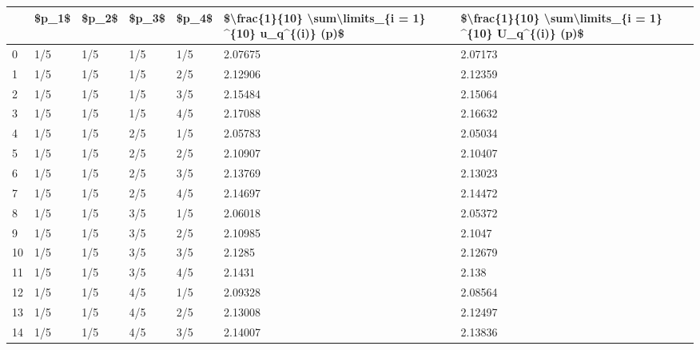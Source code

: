 \begin{tabular}{lllllll}
\toprule
{} & \$p\_1\$ & \$p\_2\$ & \$p\_3\$ & \$p\_4\$ & \$\textbackslash frac\{1\}\{10\} \textbackslash sum\textbackslash limits\_\{i = 1\} \textasciicircum  \{10\} u\_q\textasciicircum \{(i)\} (p)\$ & \$\textbackslash frac\{1\}\{10\} \textbackslash sum\textbackslash limits\_\{i = 1\} \textasciicircum  \{10\} U\_q\textasciicircum \{(i)\} (p)\$ \\
\midrule
0  &   1/5 &   1/5 &   1/5 &   1/5 &                                            2.07675 &                                            2.07173 \\
1  &   1/5 &   1/5 &   1/5 &   2/5 &                                            2.12906 &                                            2.12359 \\
2  &   1/5 &   1/5 &   1/5 &   3/5 &                                            2.15484 &                                            2.15064 \\
3  &   1/5 &   1/5 &   1/5 &   4/5 &                                            2.17088 &                                            2.16632 \\
4  &   1/5 &   1/5 &   2/5 &   1/5 &                                            2.05783 &                                            2.05034 \\
5  &   1/5 &   1/5 &   2/5 &   2/5 &                                            2.10907 &                                            2.10407 \\
6  &   1/5 &   1/5 &   2/5 &   3/5 &                                            2.13769 &                                            2.13023 \\
7  &   1/5 &   1/5 &   2/5 &   4/5 &                                            2.14697 &                                            2.14472 \\
8  &   1/5 &   1/5 &   3/5 &   1/5 &                                            2.06018 &                                            2.05372 \\
9  &   1/5 &   1/5 &   3/5 &   2/5 &                                            2.10985 &                                             2.1047 \\
10 &   1/5 &   1/5 &   3/5 &   3/5 &                                             2.1285 &                                            2.12679 \\
11 &   1/5 &   1/5 &   3/5 &   4/5 &                                             2.1431 &                                              2.138 \\
12 &   1/5 &   1/5 &   4/5 &   1/5 &                                            2.09328 &                                            2.08564 \\
13 &   1/5 &   1/5 &   4/5 &   2/5 &                                            2.13008 &                                            2.12497 \\
14 &   1/5 &   1/5 &   4/5 &   3/5 &                                            2.14007 &                                            2.13836 \\
\bottomrule
\end{tabular}
